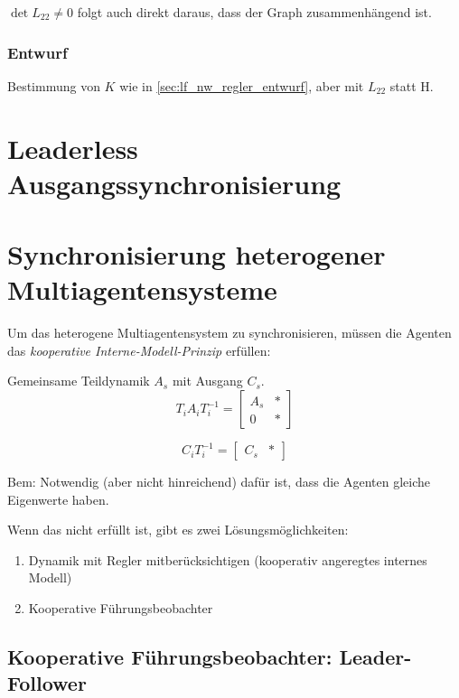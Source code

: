 $\det L_{22} \neq 0$ folgt auch direkt daraus, dass der Graph zusammenhängend ist.

\subsubsection{Entwurf}
Bestimmung von $K$ wie in \ref{sec:lf_nw_regler_entwurf},
aber mit $L_{22}$ statt H.



\section{Leaderless Ausgangssynchronisierung}



\section{Synchronisierung heterogener Multiagentensysteme}

Um das heterogene Multiagentensystem zu synchronisieren, müssen die Agenten das \emph{kooperative Interne-Modell-Prinzip} erfüllen:

Gemeinsame Teildynamik $A_s$ mit Ausgang $C_s$.
\begin{equation}
    T_i A_i T_i^{-1} = \begin{bmatrix}
        A_s & * \\
        0 & *
    \end{bmatrix}
\end{equation}

\begin{equation}
    C_i T_i^{-1} = \begin{bmatrix}
        C_s & *
    \end{bmatrix}
\end{equation}

Bem: Notwendig (aber nicht hinreichend) dafür ist, dass die Agenten gleiche Eigenwerte haben.

Wenn das nicht erfüllt ist, gibt es zwei Lösungsmöglichkeiten:
\begin{enumerate}
    \item Dynamik mit Regler mitberücksichtigen (kooperativ angeregtes internes Modell)
    \item Kooperative Führungsbeobachter
\end{enumerate}

\subsection{Kooperative Führungsbeobachter: Leader-Follower}

